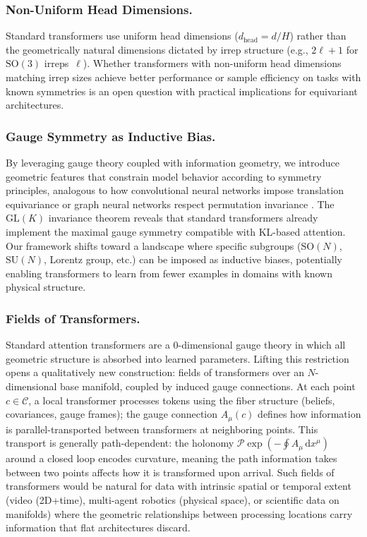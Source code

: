 \documentclass[twoside,11pt]{article}
\begin{document}
\subsubsection{Non-Uniform Head Dimensions.}

Standard transformers use uniform head dimensions ($d_{\mathrm{head}} = d/H$) rather than the geometrically natural dimensions dictated by irrep structure (e.g., $2\ell + 1$ for $\mathrm{SO}(3)$ irreps~$\ell$). Whether transformers with non-uniform head dimensions matching irrep sizes achieve better performance or sample efficiency on tasks with known symmetries is an open question with practical implications for equivariant architectures.

\subsubsection{Gauge Symmetry as Inductive Bias.}

By leveraging gauge theory coupled with information geometry, we introduce geometric features that constrain model behavior according to symmetry principles, analogous to how convolutional neural networks impose translation equivariance or graph neural networks respect permutation invariance \citep{finzi2020generalizing,weiler20183d,kondor2018generalization}. The $\mathrm{GL}(K)$ invariance theorem reveals that standard transformers already implement the maximal gauge symmetry compatible with KL-based attention. Our framework shifts toward a landscape where specific subgroups ($\mathrm{SO}(N)$, $\mathrm{SU}(N)$, Lorentz group, etc.) can be imposed as inductive biases, potentially enabling transformers to learn from fewer examples in domains with known physical structure.

\subsubsection{Fields of Transformers.}

Standard attention transformers are a 0-dimensional gauge theory in which all geometric structure is absorbed into learned parameters. Lifting this restriction opens a qualitatively new construction: fields of transformers over an $N$-dimensional base manifold, coupled by induced gauge connections. At each point $c \in \mathcal{C}$, a local transformer processes tokens using the fiber structure (beliefs, covariances, gauge frames); the gauge connection $A_\mu(c)$ defines how information is parallel-transported between transformers at neighboring points. This transport is generally path-dependent: the holonomy $\mathcal{P}\exp\!\left(-\oint A_\mu \, \mathrm{d}x^\mu\right)$ around a closed loop encodes curvature, meaning the path information takes between two points affects how it is transformed upon arrival. Such fields of transformers would be natural for data with intrinsic spatial or temporal extent (video (2D+time), multi-agent robotics (physical space), or scientific data on manifolds) where the geometric relationships between processing locations carry information that flat architectures discard.
\end{document}
